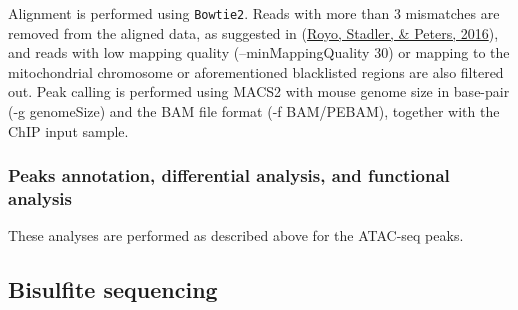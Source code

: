 \documentclass[12pt,twoside]{reedthesis}
\begin{document}
Alignment is performed using \texttt{Bowtie2}. Reads with more than 3 mismatches
are removed from the aligned data, as suggested in (\protect\hyperlink{ref-royo2016}{Royo, Stadler, \& Peters, 2016}), and
reads with low mapping quality (--minMappingQuality 30) or mapping to
the mitochondrial chromosome or aforementioned blacklisted regions are
also filtered out. Peak calling is performed using MACS2 with mouse
genome size in base-pair (-g genomeSize) and the BAM file format (-f
BAM/PEBAM), together with the ChIP input sample.

\hypertarget{m3.4.2}{%
\subsubsection*{Peaks annotation, differential analysis, and functional analysis}\label{m3.4.2}}

These analyses are performed as described above for the ATAC-seq peaks.

\hypertarget{m3.5}{%
\subsection*{Bisulfite sequencing}\label{m3.5}}
\end{document}
